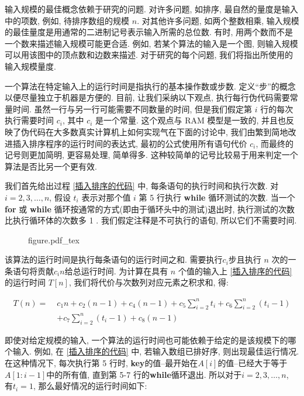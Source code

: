 \documentclass[oneside,10pt,fontset=none]{ctexbook}
\numberwithin{definition}{chapter}
\numberwithin{theorem}{chapter}
\numberwithin{lemma}{chapter}
\begin{document}
输入规模的最佳概念依赖于研究的问题. 对许多问题, 如排序, 最自然的量度是输入中的项数, 例如, 待排序数组的规模 $n$. 对其他许多问题, 如两个整数相乘, 输入规模的最佳量度是用通常的二进制记号表示输入所需的总位数. 有时, 用两个数而不是一个数来描述输入规模可能更合适. 例如, 若某个算法的输入是一个图, 则输入规模可以用该图中的顶点数和边数来描述. 对于研究的每个问题, 我们将指出所使用的输入规模量度.

一个算法在特定输入上的运行时间是指执行的基本操作数或步数. 定义``步''的概念以便尽量独立于机器是方便的. 目前, 让我们采纳以下观点, 执行每行伪代码需要常量时间. 虽然一行与另一行可能需要不同数量的时间, 但是我们假定第 $i$ 行的每次执行需要时间 $c_i$, 其中 $c_i$ 是一个常量. 这个观点与 RAM 模型是一致的, 并且也反映了伪代码在大多数真实计算机上如何实现气在下面的讨论中, 我们由繁到简地改进插入排序程序的运行时间的表达式, 最初的公式使用所有语句代价 $c_i$, 而最终的记号则更加简明, 更容易处理, 简单得多. 这种较简单的记号比较易于用来判定一个算法是否比另一个更有效.

我们首先给出过程 \ref{插入排序的代码} 中, 每条语句的执行时间和执行次数. 对 $i=2, 3, \dots, n$, 假设 $t_i$ 表示对那个值 $i$ 第 5 行执行 \textbf{while} 循环测试的次数. 当一个 \textbf{for} 或 \textbf{while} 循环按通常的方式(即由于循环头中的测试)退出时, 执行测试的次数比执行循环体的次数多 1 . 我们假定注释是不可执行的语旬, 所以它们不需要时间.

\begin{figure}[htbp]
    \centering
    \def\svgwidth{\columnwidth}
    {figure.pdf_tex}
\end{figure}

该算法的运行时间是执行每条语句的运行时间之和. 需要执行$c_i$步且执行 $n$ 次的一条语句将贡献$c_in$给总运行时间. 为计算在具有 $n$ 个值的输入上 \ref{插入排序的代码} 的运行时间 $T[n]$, 我们将代价与次数列对应元素之积求和, 得:

\begin{equation*}\begin{split}
T(n) =\; &c_1n + c_2(n-1) + c_4(n-1) + c_5\sum_{i=2}^{n}t_i + c_6\sum_{i=2}^{n}(t_i-1) \\
&+c_7\sum_{i=2}^{n}(t_i-1) + c_8(n-1)
\end{split}\end{equation*}

即使对给定规模的输入, 一个算法的运行时间也可能依赖于给定的是该规模下的哪个输入. 例如, 在 \ref{插入排序的代码} 中, 若输入数组已排好序, 则出现最佳运行情况. 在这种情况下, 每次执行第 5 行时, \textbf{key}的值--最开始在$A[i]$的值--已经大于等于$A[1:i-1]$中的所有值, 直到第 5-7 行的\textbf{while}循环退出. 所以对于$i = 2,3,\dots,n$, 有$t_i=1$, 那么最好情况的运行时间如下:
\end{document}
